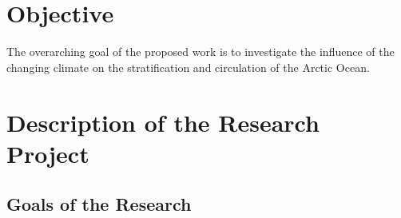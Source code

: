 \documentclass[a4paper,12pt]{article}
\begin{document}
	\newpage
	{\setlength\parskip{\fill}
		\tableofcontents
	}

	\newpage

        \section*{Objective}
        The overarching goal of the proposed work is to investigate the influence of the changing climate on the stratification and circulation of the Arctic Ocean.
	
		
	\section{Description of the Research Project}
 
	\subsection{Goals of the Research}
        
\end{document}
